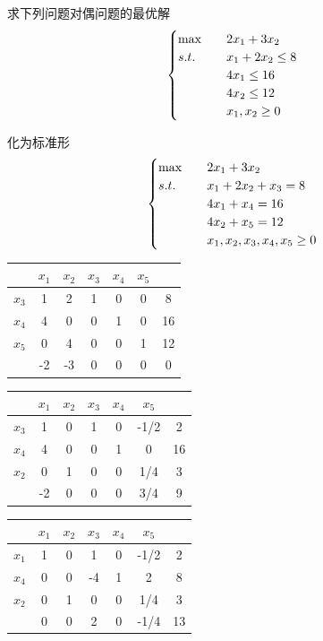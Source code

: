 \begin{example}
    求下列问题对偶问题的最优解
    \[
        \begin{cases}
            \max \quad &2x_1 + 3x_2\\
            s.t. \quad &x_1 + 2x_2 \le 8\\
            &4x_1 \le 16\\
            &4x_2 \le 12\\
            &x_1, x_2 \ge 0
        \end{cases}    
    \]

    \answer
    化为标准形
    \[
        \begin{cases}
            \max \quad &2x_1 + 3x_2\\
            s.t. \quad &x_1 + 2x_2 + x_3 = 8\\
            &4x_1 + x_4 = 16\\
            &4x_2 + x_5 = 12\\
            &x_1, x_2, x_3, x_4, x_5 \ge 0
        \end{cases}    
    \]

    \begin{center}
        \begin{tabular}{c|ccccc|c}
            & $x_1$ & $x_2$ & $x_3$ & $x_4$ & $x_5$ & \\
            \hline
            $x_3$ & 1 & 2 & 1 & 0 & 0 & 8\\
            $x_4$ & 4 & 0 & 0 & 1 & 0 & 16\\
            $x_5$ & 0 & {\color{red} 4} & 0 & 0 & 1 & 12\\
            \hline
            & -2 & -3 & 0 & 0 & 0 & 0
        \end{tabular}

        \begin{tabular}{c|ccccc|c}
            & $x_1$ & $x_2$ & $x_3$ & $x_4$ & $x_5$ & \\
            \hline
            $x_3$ & {\color{red} 1} & 0 & 1 & 0 & -1/2 & 2\\
            $x_4$ & 4 & 0 & 0 & 1 & 0 & 16\\
            $x_2$ & 0 & 1 & 0 & 0 & 1/4 & 3\\
            \hline
            & -2 & 0 & 0 & 0 & 3/4 & 9
        \end{tabular}

        \begin{tabular}{c|ccccc|c}
            & $x_1$ & $x_2$ & $x_3$ & $x_4$ & $x_5$ & \\
            \hline
            $x_1$ & 1 & 0 & 1 & 0 & -1/2 & 2\\
            $x_4$ & 0 & 0 & -4 & 1 & {\color{red} 2} & 8\\
            $x_2$ & 0 & 1 & 0 & 0 & 1/4 & 3\\
            \hline
            & 0 & 0 & 2 & 0 & -1/4 & 13
        \end{tabular}


\end{center}
\end{example}
